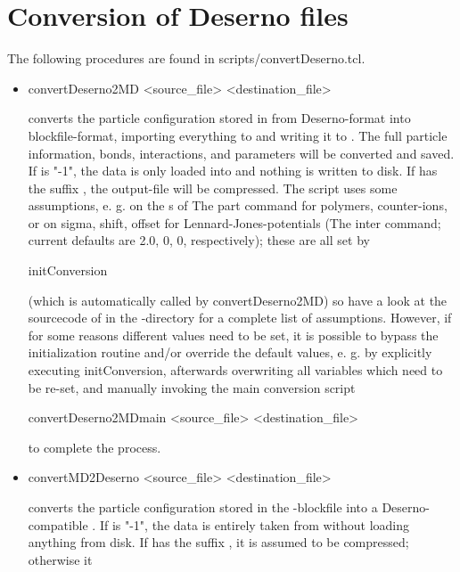 \chapter{Conversion of Deserno files}
The following procedures are found in scripts/convertDeserno.tcl.

\begin{itemize}
 \item
\begin{code}
convertDeserno2MD <source_file> <destination_file>
\end{code}
converts the particle configuration stored in  from
Deserno-format into blockfile-format, importing everything to \es{}
and writing it to . The full particle
information, bonds, interactions, and parameters will be converted and
saved.  If  is "-1", the data is only loaded
into \es{} and nothing is written to disk.  If 
has the suffix , the output-file will be compressed.  The
script uses some assumptions, e. g. on the
s of The part command for polymers,
counter-ions, or on sigma, shift, offset for Lennard-Jones-potentials
(The inter command; current defaults are 2.0, 0, 0, respectively);
these are all set by
\begin{code}
initConversion 
\end{code}
(which is automatically called by convertDeserno2MD) so have a look at
the sourcecode of  in the
-directory for a complete list of assumptions.
However, if for some reasons different values need to be set, it is
possible to bypass the initialization routine and/or override the
default values, e. g. by explicitly executing initConversion,
afterwards overwriting all variables which need to be re-set, and
manually invoking the main conversion script
\begin{code}
convertDeserno2MDmain <source_file> <destination_file> 
\end{code}
  to complete the process.
 \item
\begin{code}
convertMD2Deserno <source_file> <destination_file>
\end{code}
converts the particle configuration stored in the \es{}-blockfile
 into a Deserno-compatible .
If  is "-1", the data is entirely taken from \es{}
without loading anything from disk.  If  has the
suffix , it is assumed to be compressed; otherwise it

\end{itemize}
